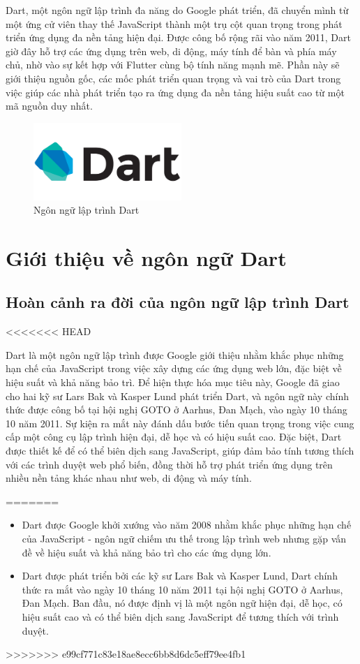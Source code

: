 \documentclass[../DoAn.tex]{subfiles}
\numberwithin{figure}{chapter}
\begin{document}
Dart, một ngôn ngữ lập trình đa năng do Google phát triển, đã chuyển mình từ một ứng cử viên thay thế JavaScript thành một trụ cột quan trọng trong phát triển ứng dụng đa nền tảng hiện đại. Được công bố rộng rãi vào năm 2011, Dart giờ đây hỗ trợ các ứng dụng trên web, di động, máy tính để bàn và phía máy chủ, nhờ vào sự kết hợp với Flutter cùng bộ tính năng mạnh mẽ. Phần này sẽ giới thiệu nguồn gốc, các mốc phát triển quan trọng và vai trò của Dart trong việc giúp các nhà phát triển tạo ra ứng dụng đa nền tảng hiệu suất cao từ một mã nguồn duy nhất.

\begin{figure}[H]
    \centering
    \includegraphics[width=0.5\textwidth]{Hinhve/dartimg.png}
    \caption{Ngôn ngữ lập trình Dart}
    \label{fig:dartimg}
\end{figure}

\section{Giới thiệu về ngôn ngữ Dart}
\subsection{Hoàn cảnh ra đời của ngôn ngữ lập trình Dart}
<<<<<<< HEAD

Dart là một ngôn ngữ lập trình được Google giới thiệu nhằm khắc phục những hạn chế của JavaScript trong việc xây dựng các ứng dụng web lớn, đặc biệt về hiệu suất và khả năng bảo trì. Để hiện thực hóa mục tiêu này, Google đã giao cho hai kỹ sư Lars Bak và Kasper Lund phát triển Dart, và ngôn ngữ này chính thức được công bố tại hội nghị GOTO ở Aarhus, Đan Mạch, vào ngày 10 tháng 10 năm 2011. Sự kiện ra mắt này đánh dấu bước tiến quan trọng trong việc cung cấp một công cụ lập trình hiện đại, dễ học và có hiệu suất cao. Đặc biệt, Dart được thiết kế để có thể biên dịch sang JavaScript, giúp đảm bảo tính tương thích với các trình duyệt web phổ biến, đồng thời hỗ trợ phát triển ứng dụng trên nhiều nền tảng khác nhau như web, di động và máy tính.

=======
\begin{itemize}
    \item Dart được Google khởi xướng vào năm 2008 nhằm khắc phục những hạn chế của JavaScript - ngôn ngữ chiếm ưu thế trong lập trình web nhưng gặp vấn đề về hiệu suất và khả năng bảo trì cho các ứng dụng lớn. 
    \item Dart được phát triển bởi các kỹ sư Lars Bak và Kasper Lund, Dart chính thức ra mắt vào ngày 10 tháng 10 năm 2011 tại hội nghị GOTO ở Aarhus, Đan Mạch. Ban đầu, nó được định vị là một ngôn ngữ hiện đại, dễ học, có hiệu suất cao và có thể biên dịch sang JavaScript để tương thích với trình duyệt.
\end{itemize}
>>>>>>> e99cf771c83e18ae8ecc6bb8d6dc5eff79ee4fb1
\end{document}
